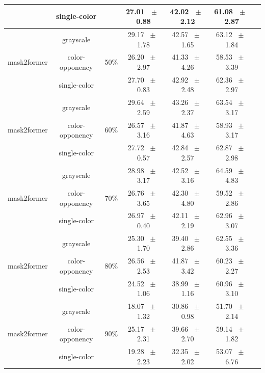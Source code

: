 \begin{table}[h]
\begin{tabular}{@{}lccc ccc@{}}
    & single-color &  & 27.01 ~$\pm$~ 0.88 & 42.02 ~$\pm$~ 2.12 & 61.08 ~$\pm$~ 2.87 \\
    \midrule
    \multirow{3}{*}{mask2former} & grayscale & \multirow{3}{*}{50\%} & 29.17 ~$\pm$~ 1.78 & 42.57 ~$\pm$~ 1.65 & 63.12 ~$\pm$~ 1.84 \\
    & color-opponency &  & 26.20 ~$\pm$~ 2.97 & 41.33 ~$\pm$~ 4.26 & 58.53 ~$\pm$~ 3.39 \\
    & single-color &  & 27.70 ~$\pm$~ 0.83 & 42.92 ~$\pm$~ 2.48 & 62.36 ~$\pm$~ 2.97 \\
    \midrule
    \multirow{3}{*}{mask2former} & grayscale & \multirow{3}{*}{60\%} & 29.64 ~$\pm$~ 2.59 & 43.26 ~$\pm$~ 2.37 & 63.54 ~$\pm$~ 3.17 \\
    & color-opponency &  & 26.57 ~$\pm$~ 3.16 & 41.87 ~$\pm$~ 4.63 & 58.93 ~$\pm$~ 3.17 \\
    & single-color &  & 27.72 ~$\pm$~ 0.57 & 42.84 ~$\pm$~ 2.57 & 62.87 ~$\pm$~ 2.98 \\
    \midrule
    \multirow{3}{*}{mask2former} & grayscale & \multirow{3}{*}{70\%} & 28.98 ~$\pm$~ 3.17 & 42.52 ~$\pm$~ 3.16 & 64.59 ~$\pm$~ 4.83 \\
    & color-opponency &  & 26.76 ~$\pm$~ 3.65 & 42.30 ~$\pm$~ 4.80 & 59.52 ~$\pm$~ 2.86 \\
    & single-color &  & 26.97 ~$\pm$~ 0.40 & 42.11 ~$\pm$~ 2.19 & 62.96 ~$\pm$~ 3.07 \\
    \midrule
    \multirow{3}{*}{mask2former} & grayscale & \multirow{3}{*}{80\%} & 25.30 ~$\pm$~ 1.70 & 39.40 ~$\pm$~ 2.86 & 62.55 ~$\pm$~ 3.36 \\
    & color-opponency &  & 26.56 ~$\pm$~ 2.53 & 41.87 ~$\pm$~ 3.42 & 60.23 ~$\pm$~ 2.27 \\
    & single-color &  & 24.52 ~$\pm$~ 1.06 & 38.99 ~$\pm$~ 1.16 & 60.96 ~$\pm$~ 3.10 \\
    \midrule
    \multirow{3}{*}{mask2former} & grayscale & \multirow{3}{*}{90\%} & 18.07 ~$\pm$~ 1.32 & 30.86 ~$\pm$~ 0.98 & 51.70 ~$\pm$~ 2.14 \\
    & color-opponency &  & 25.17 ~$\pm$~ 2.31 & 39.66 ~$\pm$~ 2.70 & 59.14 ~$\pm$~ 1.82 \\
    & single-color &  & 19.28 ~$\pm$~ 2.23 & 32.35 ~$\pm$~ 2.02 & 53.07 ~$\pm$~ 6.76 \\
    \midrule
    \bottomrule
  \end{tabular}
  \label{tab:sparse_results_mask2former_acdc_night}
\end{table}